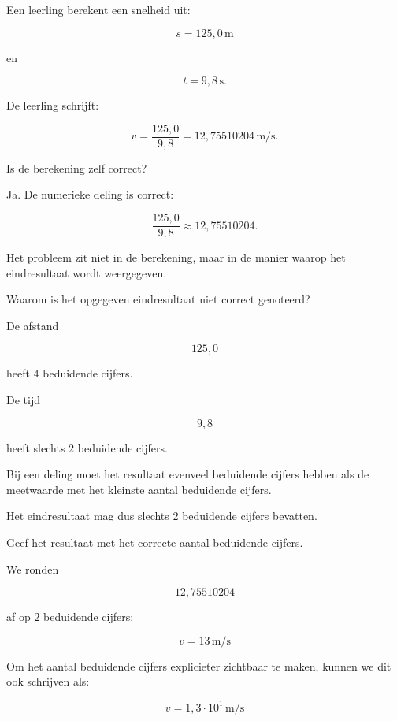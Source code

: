 \documentclass{ximera}
\begin{document}
\begin{oefening}{\oefG}

Een leerling berekent een snelheid uit:

\[
s=125{,}0\,\si{\meter}
\]

en

\[
t=9{,}8\,\si{\second}.
\]

De leerling schrijft:

\[
v
=
\frac{125{,}0}{9{,}8}
=
12{,}75510204\,\si{\meter\per\second}.
\]

\begin{question}
Is de berekening zelf correct?

\begin{oplossing}
Ja. De numerieke deling is correct:

\[
\frac{125{,}0}{9{,}8}
\approx
12{,}75510204.
\]

Het probleem zit niet in de berekening, maar in de manier waarop het
eindresultaat wordt weergegeven.
\end{oplossing}
\end{question}


\begin{question}
Waarom is het opgegeven eindresultaat niet correct genoteerd?

\begin{oplossing}
De afstand

\[
125{,}0
\]

heeft $4$ beduidende cijfers.

De tijd

\[
9{,}8
\]

heeft slechts $2$ beduidende cijfers.

Bij een deling moet het resultaat evenveel beduidende cijfers hebben als de
meetwaarde met het kleinste aantal beduidende cijfers.

Het eindresultaat mag dus slechts $2$ beduidende cijfers bevatten.
\end{oplossing}
\end{question}


\begin{question}
Geef het resultaat met het correcte aantal beduidende cijfers.

\begin{oplossing}
We ronden

\[
12{,}75510204
\]

af op $2$ beduidende cijfers:

\[
\boxed{
v=13\,\si{\meter\per\second}
}
\]

Om het aantal beduidende cijfers explicieter zichtbaar te maken, kunnen we
dit ook schrijven als:

\[
\boxed{
v=1{,}3\cdot10^1\,\si{\meter\per\second}
}
\]
\end{oplossing}
\end{question}

\end{oefening}
\end{document}
